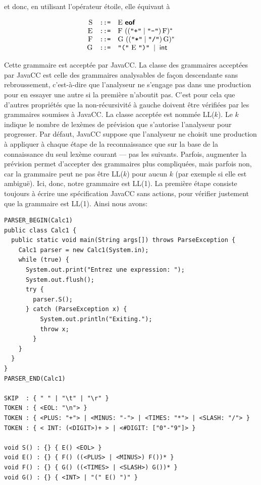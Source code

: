 \documentclass[11pt,a4paper]{article}
\newcommand{\assign}{\mbox{\texttt{::=}}\xspace}
\newcommand{\JavaCC}{\textsf{JavaCC}\xspace}
\newcommand{\str}[1]{\texttt{"{#1}"}}
\newcommand{\eof}{\textsf{\textbf{eof}}\xspace}
\begin{document}
\noindent et donc, en utilisant l'opérateur étoile, elle équivaut à

\[
\begin{array}{rcl}
  \textrm{S} & \assign & \textrm{E} \ \eof\\
  \textrm{E} & \assign & \textrm{F} \ ((\str{+} \mid
  \str{-}) \, \textrm{F})^{*}\\
  \textrm{F} & \assign & \textrm{G} \ ((\str{*} \mid
  \str{/}) \, \textrm{G})^{*}\\
  \textrm{G} & \assign & \str{(} \ \textrm{E} \ \str{)}
  \; \mid \; \textsf{int}
\end{array}
\]

\noindent Cette grammaire est acceptée par \JavaCC. La classe des
grammaires acceptées par \JavaCC est celle des grammaires analysables
de façon descendante sans rebroussement, c'est-à-dire que l'analyseur
ne s'engage pas dans une production pour en essayer une autre si la
première n'aboutit pas. C'est pour cela que d'autres propriétés
que la non-récursivité à gauche doivent être vérifiées par les
grammaires soumises à \JavaCC. La classe acceptée est nommée
LL($k$). Le $k$ indique le nombre de lexèmes de prévision que
s'autorise l'analyseur pour progresser. Par défaut, \JavaCC suppose
que l'analyseur ne choisit une production à appliquer à chaque étape
de la reconnaissance que sur la base de la connaissance du seul lexème
courant --- pas les suivants. Parfois, augmenter la prévision permet
d'accepter des grammaires plus compliquées, mais parfois non, car la
grammaire peut ne pas être LL($k$) pour aucun $k$ (par exemple si elle
est ambiguë). Ici, donc, notre grammaire est LL(1). La première étape
consiste toujours à écrire une spécification \JavaCC sans actions,
pour vérifier justement que la grammaire est LL(1). Ainsi nous avons:

{\small
\begin{verbatim}
PARSER_BEGIN(Calc1)
public class Calc1 {
  public static void main(String args[]) throws ParseException {
    Calc1 parser = new Calc1(System.in);
    while (true) {
      System.out.print("Entrez une expression: ");
      System.out.flush();
      try {
        parser.S();
      } catch (ParseException x) {
          System.out.println("Exiting.");
          throw x;
        }
    }
  }
}
PARSER_END(Calc1)

SKIP  : { " " | "\t" | "\r" }
TOKEN : { <EOL: "\n"> }
TOKEN : { <PLUS: "+"> | <MINUS: "-"> | <TIMES: "*"> | <SLASH: "/"> }
TOKEN : { < INT: (<DIGIT>)+ > | <#DIGIT: ["0"-"9"]> }

void S() : {} { E() <EOL> }
void E() : {} { F() ((<PLUS> | <MINUS>) F())* }
void F() : {} { G() ((<TIMES> | <SLASH>) G())* }
void G() : {} { <INT> | "(" E() ")" }
\end{verbatim}
}
\end{document}
